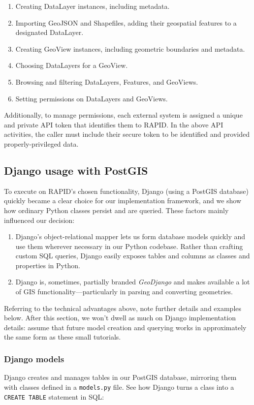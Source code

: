 \begin{enumerate}
  \item Creating DataLayer instances, including metadata.
  \item Importing GeoJSON and Shapefiles, adding their geospatial features to a designated DataLayer.
  \item Creating GeoView instances, including geometric boundaries and metadata.
  \item Choosing DataLayers for a GeoView.
  \item Browsing and filtering DataLayers, Features, and GeoViews.
  \item Setting permissions on DataLayers and GeoViews.
\end{enumerate}

Additionally, to manage permissions, each external system is assigned a unique and private API token that identifies them to RAPID. In the above API activities, the caller must include their secure token to be identified and provided properly-privileged data.

\subsection{Django usage with PostGIS}
\label{sec:prog}
To execute on RAPID's chosen functionality, Django (using a PostGIS database) quickly became a clear choice for our implementation framework, and we show how ordinary Python classes persist and are queried. These factors mainly influenced our decision:

\begin{enumerate}
\item Django's object-relational mapper lets us form database models quickly and use them wherever necessary in our Python codebase. Rather than crafting custom SQL queries, Django easily exposes tables and columns as classes and properties in Python.
\item Django is, sometimes, partially branded \textit{GeoDjango} and makes available a lot of GIS functionality---particularly in parsing and converting geometries.
\end{enumerate}

Referring to the technical advantages above, note further details and examples below. After this section, we won't dwell as much on Django implementation details: assume that future model creation and querying works in approximately the same form as these small tutorials.

\subsubsection{Django models}
Django creates and manages tables in our PostGIS database, mirroring them with classes defined in a \texttt{models.py} file. See how Django turns a class into a \texttt{CREATE TABLE} statement in SQL:

